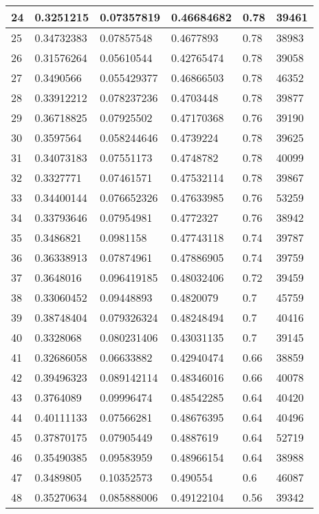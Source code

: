 \begin{longtable}{|l|l|l|l|l|l|}
24 & 0.3251215 & 0.07357819 & 0.46684682 & 0.78 & 39461 \\ \hline 
25 & 0.34732383 & 0.07857548 & 0.4677893 & 0.78 & 38983 \\ \hline 
26 & 0.31576264 & 0.05610544 & 0.42765474 & 0.78 & 39058 \\ \hline 
27 & 0.3490566 & 0.055429377 & 0.46866503 & 0.78 & 46352 \\ \hline 
28 & 0.33912212 & 0.078237236 & 0.4703448 & 0.78 & 39877 \\ \hline 
29 & 0.36718825 & 0.07925502 & 0.47170368 & 0.76 & 39190 \\ \hline 
30 & 0.3597564 & 0.058244646 & 0.4739224 & 0.78 & 39625 \\ \hline 
31 & 0.34073183 & 0.07551173 & 0.4748782 & 0.78 & 40099 \\ \hline 
32 & 0.3327771 & 0.07461571 & 0.47532114 & 0.78 & 39867 \\ \hline 
33 & 0.34400144 & 0.076652326 & 0.47633985 & 0.76 & 53259 \\ \hline 
34 & 0.33793646 & 0.07954981 & 0.4772327 & 0.76 & 38942 \\ \hline 
35 & 0.3486821 & 0.0981158 & 0.47743118 & 0.74 & 39787 \\ \hline 
36 & 0.36338913 & 0.07874961 & 0.47886905 & 0.74 & 39759 \\ \hline 
37 & 0.3648016 & 0.096419185 & 0.48032406 & 0.72 & 39459 \\ \hline 
38 & 0.33060452 & 0.09448893 & 0.4820079 & 0.7 & 45759 \\ \hline 
39 & 0.38748404 & 0.079326324 & 0.48248494 & 0.7 & 40416 \\ \hline 
40 & 0.3328068 & 0.080231406 & 0.43031135 & 0.7 & 39145 \\ \hline 
41 & 0.32686058 & 0.06633882 & 0.42940474 & 0.66 & 38859 \\ \hline 
42 & 0.39496323 & 0.089142114 & 0.48346016 & 0.66 & 40078 \\ \hline 
43 & 0.3764089 & 0.09996474 & 0.48542285 & 0.64 & 40420 \\ \hline 
44 & 0.40111133 & 0.07566281 & 0.48676395 & 0.64 & 40496 \\ \hline 
45 & 0.37870175 & 0.07905449 & 0.4887619 & 0.64 & 52719 \\ \hline 
46 & 0.35490385 & 0.09583959 & 0.48966154 & 0.64 & 38988 \\ \hline 
47 & 0.3489805 & 0.10352573 & 0.490554 & 0.6 & 46087 \\ \hline 
48 & 0.35270634 & 0.085888006 & 0.49122104 & 0.56 & 39342 \\ \hline 

\end{longtable}
